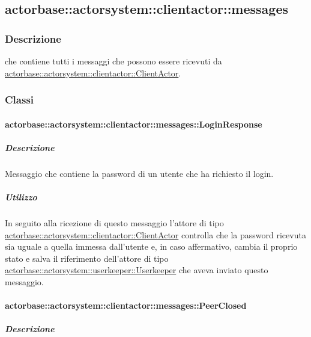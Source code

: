 \documentclass{scalatekids-article}
\begin{document}
\subsection{actorbase::actorsystem::clientactor::messages}
\label{sec:actorbase::actorsystem::clientactor::messages}

\subsubsection{Descrizione}

 che contiene tutti i messaggi che possono essere ricevuti da
\hyperref[sec:actorbase::actorsystem::clientactor::ClientActor]{actorbase::actorsystem::clientactor::ClientActor}.

\subsubsection{Classi}

\paragraph{actorbase::actorsystem::clientactor::messages::LoginResponse}
\label{sec:actorbase::actorsystem::clientactor::messages::LoginResponse}

\subparagraph{Descrizione}

Messaggio che contiene la password di un utente che ha richiesto il login.

\subparagraph{Utilizzo}

In seguito alla ricezione di questo messaggio l'attore di tipo
\hyperref[sec:actorbase::actorsystem::clientactor::ClientActor]{actorbase::\allowbreak{}actorsystem::\allowbreak{}clientactor::\allowbreak{}ClientActor}
controlla che la password ricevuta sia uguale a quella immessa
dall'utente e, in caso affermativo, cambia il proprio stato e salva
il riferimento dell'attore di tipo
\hyperref[sec:actorbase::actorsystem::userkeeper::Userkeeper]{actorbase::\allowbreak{}actorsystem::\allowbreak{}userkeeper::\allowbreak{}Userkeeper}
che aveva inviato questo messaggio.

\paragraph{actorbase::actorsystem::clientactor::messages::PeerClosed}
\label{sec:actorbase::actorsystem::clientactor::messages::PeerClosed}

\subparagraph{Descrizione}
\end{document}
